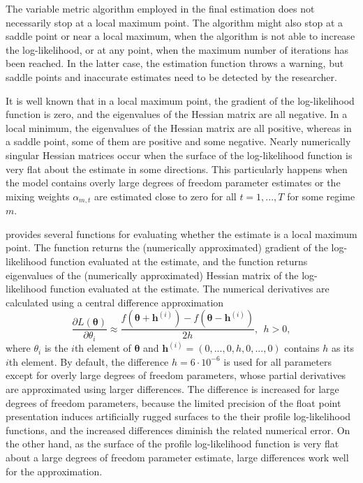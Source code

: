 \documentclass[nojss]{jss}
\begin{document}
The variable metric algorithm employed in the final estimation does not necessarily stop at a local maximum point. The algorithm might also stop at a saddle point or near a local maximum, when the algorithm is not able to increase the log-likelihood, or at any point, when the maximum number of iterations has been reached. In the latter case, the estimation function throws a warning, but saddle points and inaccurate estimates need to be detected by the researcher.

It is well known that in a local maximum point, the gradient of the log-likelihood function is zero, and the eigenvalues of the Hessian matrix are all negative. In a local minimum, the eigenvalues of the Hessian matrix are all positive, whereas in a saddle point, some of them are positive and some negative. Nearly numerically singular Hessian matrices occur when the surface of the log-likelihood function is very flat about the estimate in some directions. This particularly happens when the model contains overly large degrees of freedom parameter estimates or the mixing weights $\alpha_{m,t}$ are estimated close to zero for all $t=1,...,T$ for some regime $m$.

 provides several functions for evaluating whether the estimate is a local maximum point. The function  returns the (numerically approximated) gradient of the log-likelihood function evaluated at the estimate, and the function  returns eigenvalues of the (numerically approximated) Hessian matrix of the log-likelihood function evaluated at the estimate. The numerical derivatives are calculated using a central difference approximation
\begin{equation}
\frac{\partial L(\boldsymbol{\theta})}{\partial \theta_i} \approx \frac{f(\boldsymbol{\theta} + \boldsymbol{h}^{(i)}) - f(\boldsymbol{\theta} - \boldsymbol{h}^{(i)})}{2h}, \ \ h>0,
\end{equation}
where $\theta_i$ is the $i$th element of $\boldsymbol{\theta}$ and $\boldsymbol{h}^{(i)}=(0,...,0,h,0,...,0)$
contains $h$ as its $i$th element. By default, the difference $h=6\cdot 10^{-6}$ is used for all parameters except for overly large degrees of freedom parameters, whose partial derivatives are approximated using larger differences. The difference is increased for large degrees of freedom parameters, because the limited precision of the float point presentation induces artificially rugged surfaces to the their profile log-likelihood functions, and the increased differences diminish the related numerical error. On the other hand, as the surface of the profile log-likelihood function is very flat about a large degrees of freedom parameter estimate, large differences work well for the approximation.
\end{document}
